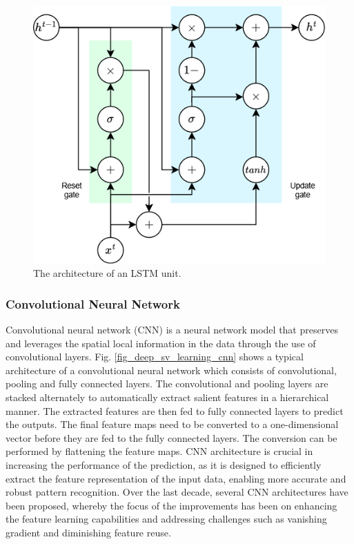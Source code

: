 \documentclass[preprint,12pt]{elsarticle}
\begin{document}
\begin{figure}[h!]
    \centering
    \includegraphics[scale=0.5]{fig_deep_sv_learning_gru.png}
    \caption{The architecture of an LSTM unit.}
    \label{fig_deep_sv_learning_gru}
\end{figure}

\subsubsection{Convolutional Neural Network} 
Convolutional neural network (CNN) is a neural network model that preserves and leverages the spatial local information in the data through the use of convolutional layers. Fig. \ref{fig_deep_sv_learning_cnn} shows a typical architecture of a convolutional neural network which consists of convolutional, pooling and fully connected layers. The convolutional and pooling layers are stacked alternately to automatically extract salient features in a hierarchical manner. The extracted features are then fed to fully connected layers to predict the outputs. The final feature maps need to be converted to a one-dimensional vector before they are fed to the fully connected layers. The conversion can be performed by flattening the feature maps. CNN architecture is crucial in increasing the performance of the prediction, as it is designed to efficiently extract the feature representation of the input data, enabling more accurate and robust pattern recognition. Over the last decade, several CNN architectures have been proposed, whereby the focus of the improvements has been on enhancing the feature learning capabilities and addressing challenges such as vanishing gradient and diminishing feature reuse.
\end{document}
